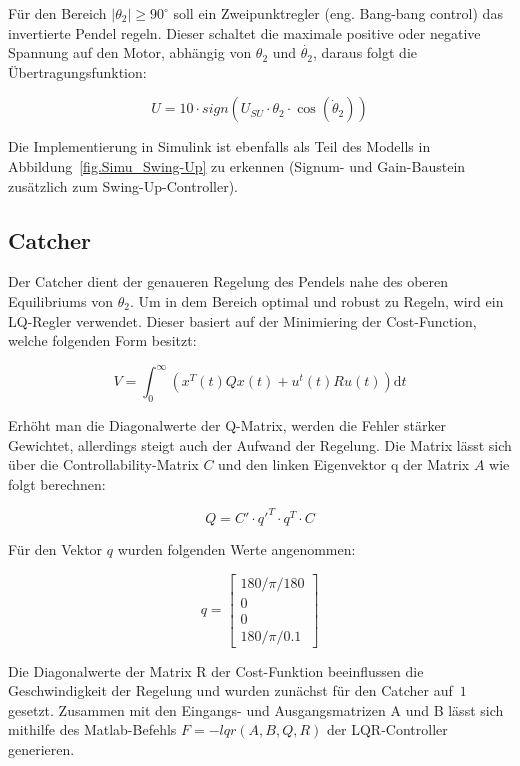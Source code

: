 Für den Bereich $\left| \theta_2 \right| \geq 90^\circ$ soll ein Zweipunktregler (eng. Bang-bang control) das invertierte Pendel regeln. Dieser schaltet die maximale positive oder negative Spannung auf den Motor, abhängig von $ \theta_2 $ und $ \dot{\theta_2} $, daraus folgt die Übertragungsfunktion:

\begin{equation}
U = 10 \cdot sign(U_{SU} \cdot \theta_2 \cdot \cos(\dot{\theta}_2))
\end{equation}

Die Implementierung in Simulink ist ebenfalls als Teil des Modells in Abbildung~\ref{fig.Simu_Swing-Up} zu erkennen (Signum- und Gain-Baustein zusätzlich zum Swing-Up-Controller).


\subsection{Catcher}
\label{catcher} 

Der Catcher dient der genaueren Regelung des Pendels nahe des oberen Equilibriums von $ \theta_2 $. Um in dem Bereich optimal und robust zu Regeln, wird ein LQ-Regler verwendet. Dieser basiert auf der Minimiering der Cost-Function, welche folgenden Form besitzt:

\begin{equation}
 V = \int_0^\infty \! (x^T(t) Qx(t) + u^t(t) R u(t))  \mathrm{d}t
\end{equation}

Erhöht man die Diagonalwerte der Q-Matrix, werden die Fehler stärker Gewichtet, allerdings steigt auch der Aufwand der Regelung. Die Matrix lässt sich über die Controllability-Matrix $C$ und den linken Eigenvektor q der Matrix $A$
wie folgt berechnen:

\begin{equation}
 Q = C' \cdot q'^T \cdot q^T \cdot C
\end{equation}

Für den Vektor $q$ wurden folgenden Werte angenommen:

\begin{equation}
q =\begin{bmatrix}
         180/\pi/180 \\
         0\\
         0\\
         180/\pi/0.1
        \end{bmatrix}
\end{equation}
 
Die Diagonalwerte der Matrix R der Cost-Funktion beeinflussen die Geschwindigkeit der Regelung und wurden zunächst für den Catcher auf~$1$ gesetzt.
Zusammen mit den Eingangs- und Ausgangsmatrizen A und B lässt sich mithilfe des Matlab-Befehls $F = -lqr(A,B,Q,R)$ der LQR-Controller generieren.\citep{Werner.2013}

